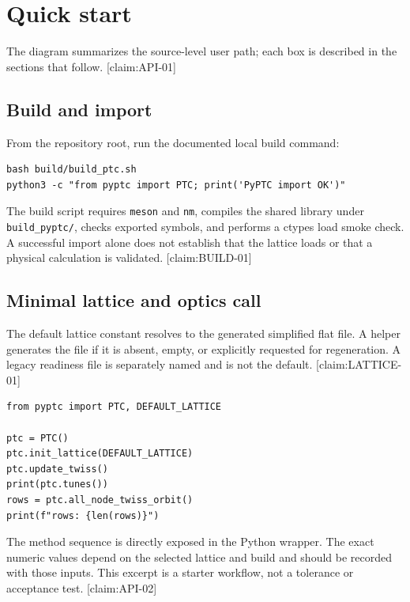 \section{Quick start}
\label{sec:quick-start}

\begin{center}
\end{center}
The diagram summarizes the source-level user path; each box is described in the sections that follow. [claim:API-01]

\subsection{Build and import}

From the repository root, run the documented local build command:
\begin{verbatim}
bash build/build_ptc.sh
python3 -c "from pyptc import PTC; print('PyPTC import OK')"
\end{verbatim}
The build script requires \texttt{meson} and \texttt{nm}, compiles the shared library under \texttt{build\_pyptc/}, checks exported symbols, and performs a ctypes load smoke check. A successful import alone does not establish that the lattice loads or that a physical calculation is validated. [claim:BUILD-01]

\subsection{Minimal lattice and optics call}

The default lattice constant resolves to the generated simplified flat file. A helper generates the file if it is absent, empty, or explicitly requested for regeneration. A legacy readiness file is separately named and is not the default. [claim:LATTICE-01]

\begin{verbatim}
from pyptc import PTC, DEFAULT_LATTICE

ptc = PTC()
ptc.init_lattice(DEFAULT_LATTICE)
ptc.update_twiss()
print(ptc.tunes())
rows = ptc.all_node_twiss_orbit()
print(f"rows: {len(rows)}")
\end{verbatim}
The method sequence is directly exposed in the Python wrapper. The exact numeric values depend on the selected lattice and build and should be recorded with those inputs. This excerpt is a starter workflow, not a tolerance or acceptance test. [claim:API-02]


